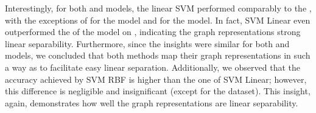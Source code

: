 Interestingly, for both \gnn and \wlnn models, the linear \textsf{SVM} performed comparably to the \mlp, with the exceptions of \enzymes for the \wlnn model and \nci for the \gnn model. In fact, \textsf{SVM Linear} even outperformed the \mlp of the \gnn model on \mutag, indicating the graph representations strong linear separability. Furthermore, since the insights were similar for both \gnn and \wlnn models, we concluded that both methods map their graph representations in such a way as to facilitate easy linear separation. Additionally, we observed that the accuracy achieved by \textsf{SVM RBF} is higher than the one of \textsf{SVM Linear}; however, this difference is negligible and insignificant (except for the \enzymes dataset). This insight, again, demonstrates how well the graph representations are linear separability.

